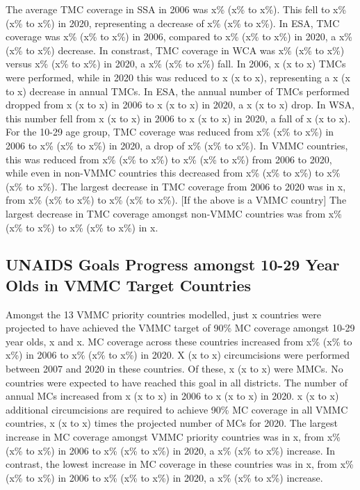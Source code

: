 \documentclass{article}
\begin{document}
The average TMC coverage in SSA in 2006 was x\% (x\% to x\%). 
This fell to x\% (x\% to x\%) in 2020, representing a decrease of x\% (x\% to x\%). 
In ESA, TMC coverage was x\% (x\% to x\%) in 2006, compared to x\% (x\% to x\%) in 2020, a x\% (x\% to x\%) decrease. In constrast, TMC coverage in WCA was x\% (x\% to x\%) versus x\% (x\% to x\%) in 2020, a x\% (x\% to x\%) fall. 
In 2006, x (x to x) TMCs were performed, while in 2020 this was reduced to x (x to x), representing a x (x to x) decrease in annual TMCs.
In ESA, the annual number of TMCs performed dropped from x (x to x) in 2006 to x (x to x) in 2020, a x (x to x) drop. 
In WSA, this number fell from x (x to x) in 2006 to x (x to x) in 2020, a fall of x (x to x).
For the 10-29 age group, TMC coverage was reduced from x\% (x\% to x\%) in 2006 to x\% (x\% to x\%) in 2020, a drop of x\% (x\% to x\%).
In VMMC countries, this was reduced from x\% (x\% to x\%) to x\% (x\% to x\%) from 2006 to 2020, while even in non-VMMC countries this decreased from x\% (x\% to x\%) to x\% (x\% to x\%). 
The largest decrease in TMC coverage from 2006 to 2020 was in x, from x\% (x\% to x\%) to x\% (x\% to x\%). 
[If the above is a VMMC country] The largest decrease in TMC coverage amongst non-VMMC countries was from x\% (x\% to x\%) to x\% (x\% to x\%) in x. 

\subsection{UNAIDS Goals Progress amongst 10-29 Year Olds in VMMC Target Countries}
\label{sec:orgf9204d9}

Amongst the 13 VMMC priority countries modelled, just x countries were projected to have achieved the VMMC target of 90\% MC coverage amongst 10-29 year olds, x and x. 
MC coverage across these countries increased from x\% (x\% to x\%) in 2006 to x\% (x\% to x\%) in 2020. 
X (x to x) circumcisions were performed between 2007 and 2020 in these countries. 
Of these, x (x to x) were MMCs. 
No countries were expected to have reached this goal in all districts. 
The number of annual MCs increased from x (x to x) in 2006 to x (x to x) in 2020. 
x (x to x) additional circumcisions are required to achieve 90\% MC coverage in all VMMC countries, x (x to x) times the projected number of MCs for 2020. 
The largest increase in MC coverage amongst VMMC priority countries was in x, from x\% (x\% to x\%) in 2006 to x\% (x\% to x\%) in 2020, a x\% (x\% to x\%) increase. 
In contrast, the lowest increase in MC coverage in these countries was in x, from x\% (x\% to x\%) in 2006 to x\% (x\% to x\%) in 2020, a x\% (x\% to x\%) increase. 
\end{document}
